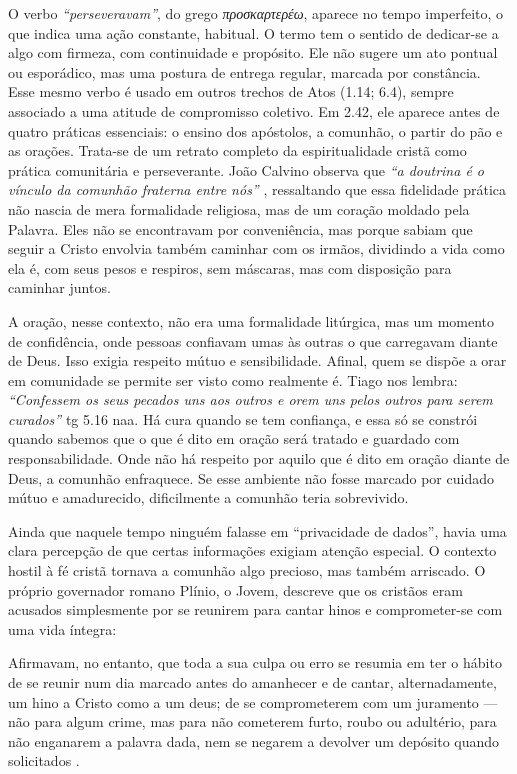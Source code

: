 O verbo \textit{``perseveravam''}, do grego \textit{\foreignlanguage{greek}{προσκαρτερέω}}, aparece no tempo imperfeito, o que indica uma ação constante, habitual. O termo tem o sentido de dedicar-se a algo com firmeza, com continuidade e propósito. Ele não sugere um ato pontual ou esporádico, mas uma postura de entrega regular, marcada por constância. Esse mesmo verbo é usado em outros trechos de Atos (1.14; 6.4), sempre associado a uma atitude de compromisso coletivo. Em 2.42, ele aparece antes de quatro práticas essenciais: o ensino dos apóstolos, a comunhão, o partir do pão e as orações. Trata-se de um retrato completo da espiritualidade cristã como prática comunitária e perseverante. João Calvino observa que \textit{``a doutrina é o vínculo da comunhão fraterna entre nós''} \cite{calvinoAtos2}, ressaltando que essa fidelidade prática não nascia de mera formalidade religiosa, mas de um coração moldado pela Palavra. Eles não se encontravam por conveniência, mas porque sabiam que seguir a Cristo envolvia também caminhar com os irmãos, dividindo a vida como ela é, com seus pesos e respiros, sem máscaras, mas com disposição para caminhar juntos.

A oração, nesse contexto, não era uma formalidade litúrgica, mas um momento de confidência, onde pessoas confiavam umas às outras o que carregavam diante de Deus. Isso exigia respeito mútuo e sensibilidade. Afinal, quem se dispõe a orar em comunidade se permite ser visto como realmente é. Tiago nos lembra: \textit{``Confessem os seus pecados uns aos outros e orem uns pelos outros para serem curados''} \gls{tg} 5.16 \gls{naa}. Há cura quando se tem confiança, e essa só se constrói quando sabemos que o que é dito em oração será tratado e guardado com responsabilidade. Onde não há respeito por aquilo que é dito em oração diante de Deus, a comunhão enfraquece. Se esse ambiente não fosse marcado por cuidado mútuo e amadurecido, dificilmente a comunhão teria sobrevivido.

Ainda que naquele tempo ninguém falasse em “privacidade de dados”, havia uma clara percepção de que certas informações exigiam atenção especial. O contexto hostil à fé cristã tornava a comunhão algo precioso, mas também arriscado. O próprio governador romano Plínio, o Jovem, descreve que os cristãos eram acusados simplesmente por se reunirem para cantar hinos e comprometer-se com uma vida íntegra:

\begin{citacao}
    Afirmavam, no entanto, que toda a sua culpa ou erro se resumia em ter o hábito de se reunir num dia marcado antes do amanhecer e de cantar, alternadamente, um hino a Cristo como a um deus; de se comprometerem com um juramento — não para algum crime, mas para não cometerem furto, roubo ou adultério, para não enganarem a palavra dada, nem se negarem a devolver um depósito quando solicitados \cite[p.~272]{plinioCartasX}.
\end{citacao}

